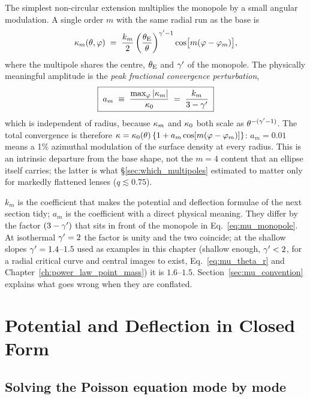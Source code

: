 The simplest non-circular extension multiplies the monopole by a small
angular modulation.  A single order $m$ with the same radial
run as the base is
\begin{equation}
    \kappa_m(\theta,\varphi)
    \;=\; \frac{k_m}{2}\left(\frac{\theta_{\mathrm{E}}}{\theta}\right)^{\gamma'-1}
    \cos\!\big[m(\varphi-\varphi_m)\big],
    \label{eq:mu_kappam}
\end{equation}
where the multipole shares the centre, $\theta_{\mathrm{E}}$ and $\gamma'$ of the
monopole.  The physically meaningful amplitude is the \emph{peak
fractional convergence perturbation},
\begin{equation}
    \boxed{\;
    a_m \;\equiv\; \frac{\max_\varphi|\kappa_m|}{\kappa_0}
    \;=\; \frac{k_m}{3-\gamma'}
    \;}
    \label{eq:mu_am}
\end{equation}
which is independent of radius, because $\kappa_m$ and
$\kappa_0$ both scale as $\theta^{-(\gamma'-1)}$.  The total convergence
is therefore
$\kappa = \kappa_0(\theta)\,\{1 + a_m\cos[m(\varphi-\varphi_m)]\}$:
$a_m = 0.01$ means a 1\% azimuthal modulation of the surface density at
every radius.  This is an intrinsic departure from the base
shape, not the $m=4$ content that an ellipse itself carries; the latter
is what \S\ref{sec:which_multipoles} estimated to matter only for
markedly flattened lenses ($q\lesssim0.75$).

\begin{annotation}
$k_m$ is the coefficient that makes the potential and deflection
formulae of the next section tidy; $a_m$ is the coefficient with a
direct physical meaning.  They differ by the factor $(3-\gamma')$ that sits
in front of the monopole in Eq.~\eqref{eq:mu_monopole}.  At isothermal
$\gamma'=2$ the factor is unity and the two coincide; at the shallow slopes
$\gamma'=1.4$--$1.5$ used as examples in this chapter (shallow enough,
$\gamma'<2$, for a radial critical curve and central images to exist,
Eq.~\eqref{eq:mu_theta_r} and Chapter~\ref{ch:power_law_point_mass}) it
is $1.6$--$1.5$.  Section~\ref{sec:mu_convention} explains what goes
wrong when they are conflated.
\end{annotation}


\section{Potential and Deflection in Closed Form}
\label{sec:mu_potential}

\subsection{Solving the Poisson equation mode by mode}

